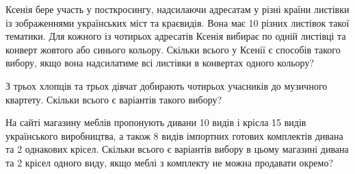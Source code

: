 \documentclass[12pt]{article}
\begin{document}
\begin{samepage}
\noindent\zadnum Ксенія бере участь у посткросингу, надсилаючи адресатам у різні країни листівки із зображеннями українських міст та краєвидів. Вона має 10 різних листівок такої тематики. Для кожного із чотирьох адресатів Ксенія вибирає по одній листівці та конверт жовтого або синього кольору. Скільки всього у Ксенії є способів такого вибору, якщо вона надсилатиме всі листівки в конвертах одного кольору? 

\nmtnobreak
\nopagebreak\nbvspace{0.5cm}
\nmtAnswerBox
\par{}
\end{samepage}

\begin{samepage}
\noindent\zadnum З трьох хлопців та трьох дівчат добирають чотирьох учасників до музичного квартету. Скільки всього є варіантів такого вибору? 

\nmtnobreak
\nopagebreak\nbvspace{0.5cm}
\nmtAnswerBox
\par{}
\end{samepage}

\begin{samepage}
\noindent\zadnum На сайті магазину меблів пропонують дивани 10 видів і крісла 15 видів українського виробництва, а також 8 видів імпортних готових комплектів дивана та 2 однакових крісел. Скільки всього є варіантів вибору в цьому магазині дивана та 2 крісел одного виду, якщо меблі з комплекту не можна продавати окремо? 

\nmtnobreak
\nopagebreak\nbvspace{0.5cm}
\nmtAnswerBox
\par{}
\end{samepage}
\end{document}
